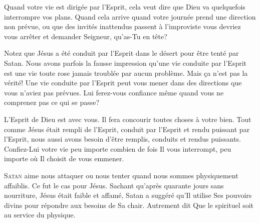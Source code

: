 Quand votre vie est dirigée par l'Esprit, cela veut dire que Dieu
 va quelquefois interrompre vos plans. Quand cela arrive
 \ocadr quand votre journée prend une direction non prévue,
 ou que des invités inattendus passent à l'improviste \fcadr{}
 vous devriez vous arrêter et demander\frcolon{} 
 \Og Seigneur, qu'as-Tu en tête? \Fg{} 


Notez que Jésus a été conduit par l'Esprit dans le désert pour être tenté
 par Satan. Nous avons parfois la fausse impression qu'une vie conduite
 par l'Esprit est une vie toute rose jamais troublée par aucun problème.
 Mais \c{c}a n'est pas la vérité! Une vie conduite par l'Esprit
 peut vous mener dans des directions que vous n'aviez pas prévues.
 Lui ferez-vous confiance même quand vous ne comprenez pas
 ce qui se passe?

L'Esprit de Dieu est avec vous. Il fera concourir toutes choses à votre bien.
 Tout comme Jésus était rempli de l'Esprit, conduit par l'Esprit
 et rendu puissant par l'Esprit, nous aussi avons besoin d'être remplis,
 conduits et rendus puissants. Confiez-Lui votre vie
 \ocadr peu importe combien de fois Il vous interrompt,
 peu importe où Il choisit de vous emmener.

\dvrule







\lettrine{S}{atan} aime nous attaquer ou nous tenter
 quand nous sommes physiquement affaiblis.
 Ce fut le cas pour Jésus. Sachant qu'après quarante jours sans nourriture,
 Jésus était faible et affamé, Satan a suggéré qu'Il utilise
 Ses pouvoirs divins pour répondre aux besoins de Sa chair.
 Autrement dit\frcolon{} 
 \Og Que le spirituel soit au service du physique. \Fg{}

